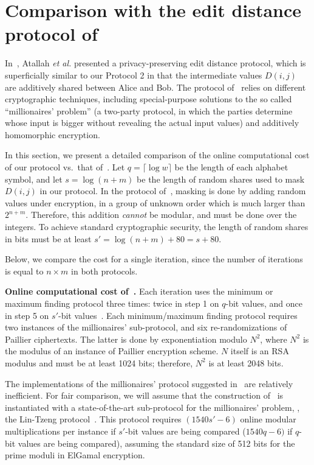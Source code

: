 
\section{Comparison with the edit distance protocol of~\cite{atallah}}
\label{appendix-atallah}

In~\cite{atallah}, Atallah \emph{et al.} presented a privacy-preserving
edit distance protocol, which is superficially similar to our Protocol 2
in that the intermediate values $D(i,j)$ are additively shared between
Alice and Bob.  The protocol of~\cite{atallah} relies on different
cryptographic techniques, including special-purpose solutions to the so
called ``millionaires' problem'' (a two-party protocol, in which the
parties determine whose input is bigger without revealing the actual
input values) and additively homomorphic encryption.

In this section, we present a detailed comparison of the online
computational cost of our protocol vs.\ that of~\cite{atallah}.  Let $q
= \lceil \log w \rceil$ be the length of each alphabet symbol, and
let $s=\log(n+m)$ be the length of random shares used to mask $D(i,j)$
in our protocol.  In the protocol of~\cite{atallah}, masking is done by
adding random values under encryption, in a group of unknown order which
is much larger than $2^{n+m}$.  Therefore, this addition \emph{cannot}
be modular, and must be done over the integers.  To achieve standard
cryptographic security, the length of random shares in bits must be at
least $s'=\log(n+m)+80=s+80$.

Below, we compare the cost for a single iteration, since the number of
iterations is equal to $n \times m$ in both protocols.

\vspace{1ex}
\noindent
\textbf{Online computational cost of~\cite{atallah}.}
Each iteration uses the minimum or maximum finding protocol three times:
twice in step 1 on $q$-bit values, and once in step 5 on $s'$-bit
values~\cite[section 4.1]{atallah}.  Each minimum/maximum finding
protocol requires two instances of the millionaires' sub-protocol, and
six re-randomizations of Paillier ciphertexts.  The latter is done by
exponentiation modulo $N^2$, where $N^2$ is the modulus of an instance
of Paillier encryption scheme.  $N$ itself is an RSA modulus and must
be at least 1024 bits; therefore, $N^2$ is at least 2048 bits.

The implementations of the millionaires' protocol suggested
in~\cite{atallah} are relatively inefficient.  For fair comparison,
we will assume that the construction of~\cite{atallah} is instantiated
with a state-of-the-art sub-protocol for the millionaires' problem, \eg,
the Lin-Tzeng protocol~\cite{lintzeng-acns05}.  This protocol requires
$(1540 s' - 6)$ online modular multiplications per instance if $s'$-bit
values are being compared ($1540 q - 6)$ if $q$-bit values are being
compared), assuming the standard size of 512 bits for the prime moduli
in ElGamal encryption.


